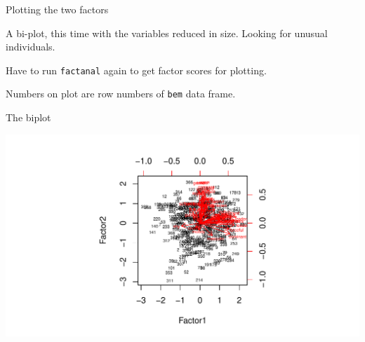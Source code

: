 \begin{frame}[fragile]{Plotting the two factors}
  
A bi-plot, this time with the variables reduced in size. Looking for
unusual individuals.

Have to run \texttt{factanal} again to get factor scores for plotting.

\begin{knitrout}
\color{fgcolor}\begin{kframe}
\begin{alltt}
\hlkwb{=}\hlstd{(bem[,}\hlopt{-}\hlstd{],}\hlstd{=}\hlstd{,}\hlstd{=}\hlstd{)}
\hlopt{$}\hlopt{$}\hlstd{=}\hlstd{(}\hlstd{,}\hlstd{))}
\end{alltt}
\end{kframe}
\end{knitrout}

Numbers on plot are row numbers of \texttt{bem}
data frame.
  
\end{frame}

\begin{frame}[fragile]{The biplot}
  
  
\begin{knitrout}
\color{fgcolor}
\includegraphics[width=\maxwidth]{figure/biplot-two-ag-1} 

\end{knitrout}
  
  
\end{frame}


